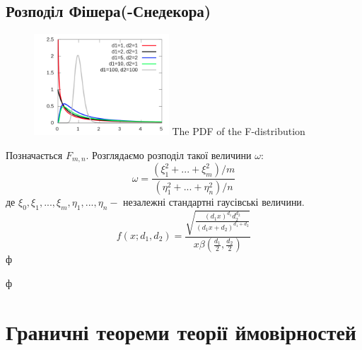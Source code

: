 \subsection{Розподіл Фішера(-Снедекора)}
\begin{figure}
\centering
\includegraphics[width=0.45\textwidth]{assets/lectures_part_3-c1782fcb.png}
The PDF of the F-distribution
\end{figure}
Позначається $F_{m,n}$. Розглядаємо розподіл такої величини $\omega:$
$$
\omega = \frac{\left( \xi_1^2 + ... + \xi_m^2 \right)/ m }{\left( \eta_1^2 + ... + \eta_n^2 \right)/n}
$$
де $\xi_0, \xi_1, ... , \xi_m, \eta_1, ... , \eta_n - $ незалежні стандартні гаусівські величини.
$$
f(x; d_1,d_2) = \frac{\sqrt{\frac{(d_1x)^{d_1}d_2^{d_2}} {(d_1x+d_2)^{d_1+d_2}}}} {x\beta\!\left(\frac{d_1}{2},\frac{d_2}{2}\right)}
$$
$ф$\\
\par
$ф$\\
\par

\newpage

\section{Граничні теореми теорії ймовірностей}

